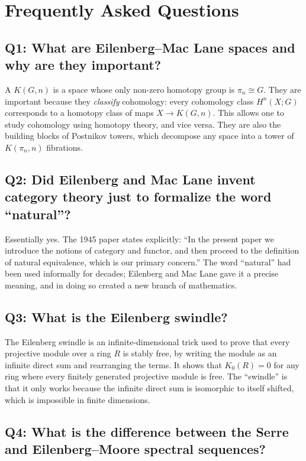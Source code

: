 \section{Frequently Asked Questions}

\subsection*{Q1: What are Eilenberg--Mac Lane spaces and why are they important?}

A $K(G,n)$ is a space whose only non-zero homotopy group is $\pi_n \cong G$. They are important because they \textit{classify} cohomology: every cohomology class $H^n(X; G)$ corresponds to a homotopy class of maps $X \to K(G,n)$. This allows one to study cohomology using homotopy theory, and vice versa. They are also the building blocks of Postnikov towers, which decompose any space into a tower of $K(\pi_n,n)$ fibrations.

\subsection*{Q2: Did Eilenberg and Mac Lane invent category theory just to formalize the word ``natural''?}

Essentially yes. The 1945 paper states explicitly: ``In the present paper we introduce the notions of category and functor, and then proceed to the definition of natural equivalence, which is our primary concern.'' The word ``natural'' had been used informally for decades; Eilenberg and Mac Lane gave it a precise meaning, and in doing so created a new branch of mathematics.

\subsection*{Q3: What is the Eilenberg swindle?}

The Eilenberg swindle is an infinite-dimensional trick used to prove that every projective module over a ring $R$ is stably free, by writing the module as an infinite direct sum and rearranging the terms. It shows that $K_0(R) = 0$ for any ring where every finitely generated projective module is free. The ``swindle'' is that it only works because the infinite direct sum is isomorphic to itself shifted, which is impossible in finite dimensions.

\subsection*{Q4: What is the difference between the Serre and Eilenberg--Moore spectral sequences?}

